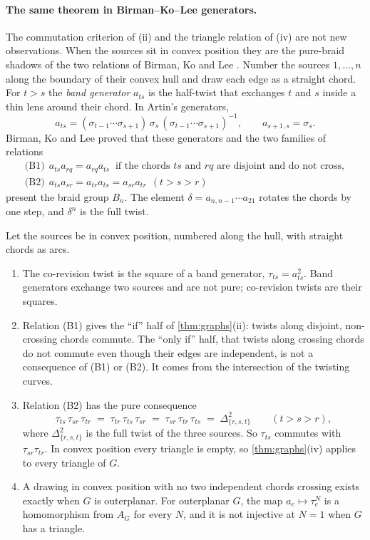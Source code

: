 \documentclass[11pt]{article}
\theoremstyle{definition}\newtheorem{definition}[theorem]{Definition}\newtheorem{remark}[theorem]{Remark}\newtheorem{example}[theorem]{Example}\newtheorem{problem}[theorem]{Open problem}\crefname{problem}{Problem}{Problems}
\begin{document}
\paragraph{The same theorem in Birman--Ko--Lee generators.} The commutation criterion of (ii) and the triangle relation of (iv) are not new observations. When the sources sit in convex position they are the pure-braid shadows of the two relations of Birman, Ko and Lee \cite{BirmanKoLee1998}. Number the sources $1,\dots,n$ along the boundary of their convex hull and draw each edge as a straight chord. For $t>s$ the \emph{band generator} $a_{ts}$ is the half-twist that exchanges $t$ and $s$ inside a thin lens around their chord. In Artin's generators,
\[
a_{ts}=(\sigma_{t-1}\cdots\sigma_{s+1})\,\sigma_s\,(\sigma_{t-1}\cdots\sigma_{s+1})^{-1},\qquad a_{s+1,s}=\sigma_s .
\]
Birman, Ko and Lee proved that these generators and the two families of relations
\begin{gather*}
\text{(B1)}\ \ a_{ts}a_{rq}=a_{rq}a_{ts}\ \text{ if the chords $ts$ and $rq$ are disjoint and do not cross},\\
\text{(B2)}\ \ a_{ts}a_{sr}=a_{tr}a_{ts}=a_{sr}a_{tr}\ \ (t>s>r)
\end{gather*}
present the braid group $B_n$. The element $\delta=a_{n,n-1}\cdots a_{21}$ rotates the chords by one step, and $\delta^n$ is the full twist.

\begin{corollary}\label{cor:bkl}
Let the sources be in convex position, numbered along the hull, with straight chords as arcs.
\begin{enumerate}
\item[(i)] The co-revision twist is the square of a band generator, $\tau_{ts}=a_{ts}^2$. Band generators exchange two sources and are not pure; co-revision twists are their squares.
\item[(ii)] Relation (B1) gives the ``if'' half of \cref{thm:graphs}(ii): twists along disjoint, non-crossing chords commute. The ``only if'' half, that twists along crossing chords do not commute even though their edges are independent, is not a consequence of (B1) or (B2). It comes from the intersection of the twisting curves.
\item[(iii)] Relation (B2) has the pure consequence
\[
\tau_{ts}\,\tau_{sr}\,\tau_{tr}\;=\;\tau_{tr}\,\tau_{ts}\,\tau_{sr}\;=\;\tau_{sr}\,\tau_{tr}\,\tau_{ts}\;=\;\Delta^2_{\{r,s,t\}}\qquad(t>s>r),
\]
where $\Delta^2_{\{r,s,t\}}$ is the full twist of the three sources. So $\tau_{ts}$ commutes with $\tau_{sr}\tau_{tr}$. In convex position every triangle is empty, so \cref{thm:graphs}(iv) applies to every triangle of $G$.
\item[(iv)] A drawing in convex position with no two independent chords crossing exists exactly when $G$ is outerplanar. For outerplanar $G$, the map $a_e\mapsto\tau_e^N$ is a homomorphism from $A_G$ for every $N$, and it is not injective at $N=1$ when $G$ has a triangle.
\end{enumerate}
\end{corollary}
\end{document}
